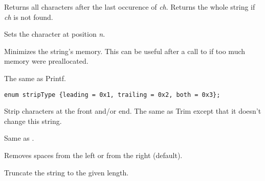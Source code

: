Returns all characters after the last occurence of {\it ch}.
Returns the whole string if {\it ch} is not found.

\label{wxstringsetchar}


Sets the character at position {\it n}.

\label{wxstringshrink}


Minimizes the string's memory. This can be useful after a call to 
 if too much memory were preallocated.

\label{wxstringsprintf}


The same as Printf.

\label{wxstringstrip}

\begin{verbatim}
enum stripType {leading = 0x1, trailing = 0x2, both = 0x3};
\end{verbatim}


Strip characters at the front and/or end. The same as Trim except that it
doesn't change this string.

\label{wxstringsubstring}


Same as .

\label{wxstringtrim}


Removes spaces from the left or from the right (default).

\label{wxstringtruncate}


Truncate the string to the given length.

\label{wxstringungetwritebuf}


